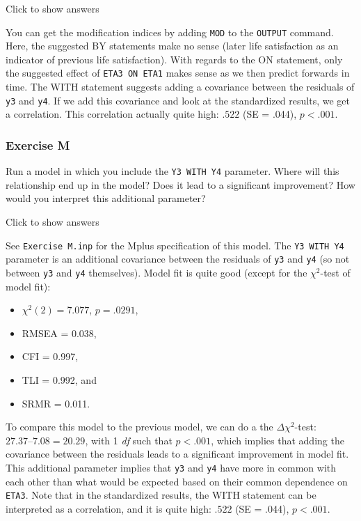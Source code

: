 \documentclass[
]{book}
\providecommand{\tightlist}{%
  \setlength{\itemsep}{0pt}\setlength{\parskip}{0pt}}
\begin{document}
Click to show answers

You can get the modification indices by adding \texttt{MOD} to the \texttt{OUTPUT} command. Here, the suggested BY statements make no sense (later life satisfaction as an indicator of previous life satisfaction). With regards to the ON statement, only the suggested effect of \texttt{ETA3\ ON\ ETA1} makes sense as we then predict forwards in time. The WITH statement suggests adding a covariance between the residuals of \texttt{y3} and \texttt{y4}. If we add this covariance and look at the standardized results, we get a correlation. This correlation actually quite high: \(.522\) (SE = .044), \(p < .001\).

\hypertarget{exercise-m}{%
\subsubsection*{Exercise M}\label{exercise-m}}

Run a model in which you include the \texttt{Y3\ WITH\ Y4} parameter. Where will this relationship end up in the model? Does it lead to a significant improvement? How would you interpret this additional parameter?

Click to show answers

See \texttt{Exercise\ M.inp} for the Mplus specification of this model. The \texttt{Y3\ WITH\ Y4} parameter is an additional covariance between the residuals of \texttt{y3} and \texttt{y4} (so not between \texttt{y3} and \texttt{y4} themselves). Model fit is quite good (except for the \(\chi^{2}\)-test of model fit):

\begin{itemize}
\tightlist
\item
  \(\chi^{2} (2) = 7.077\), \(p = .0291\),
\item
  RMSEA = 0.038,
\item
  CFI = 0.997,
\item
  TLI = 0.992, and
\item
  SRMR = 0.011.
\end{itemize}

To compare this model to the previous model, we can do a the \(\Delta \chi^{2}\)-test: \(27.37 – 7.08 = 20.29\), with 1 \emph{df} such that \(p < .001\), which implies that adding the covariance between the residuals leads to a significant improvement in model fit. This additional parameter implies that \texttt{y3} and \texttt{y4} have more in common with each other than what would be expected based on their common dependence on \texttt{ETA3}. Note that in the standardized results, the WITH statement can be interpreted as a correlation, and it is quite high: \(.522\) (SE = .044), \(p < .001\).
\end{document}
